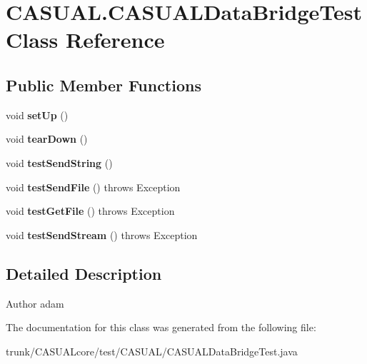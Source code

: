 \hypertarget{classCASUAL_1_1CASUALDataBridgeTest}{\section{C\-A\-S\-U\-A\-L.\-C\-A\-S\-U\-A\-L\-Data\-Bridge\-Test Class Reference}
\label{classCASUAL_1_1CASUALDataBridgeTest}
}
\subsection*{Public Member Functions}
\begin{DoxyCompactItemize}
\item 
\hypertarget{classCASUAL_1_1CASUALDataBridgeTest_a6cbfa475ba06d452fcc0184704e1db26}{void {\bfseries set\-Up} ()}\label{classCASUAL_1_1CASUALDataBridgeTest_a6cbfa475ba06d452fcc0184704e1db26}

\item 
\hypertarget{classCASUAL_1_1CASUALDataBridgeTest_abd31aa43241e809aa8beefe78f632353}{void {\bfseries tear\-Down} ()}\label{classCASUAL_1_1CASUALDataBridgeTest_abd31aa43241e809aa8beefe78f632353}

\item 
\hypertarget{classCASUAL_1_1CASUALDataBridgeTest_aae8e888442289e5a5fbe181ea4252f65}{void {\bfseries test\-Send\-String} ()}\label{classCASUAL_1_1CASUALDataBridgeTest_aae8e888442289e5a5fbe181ea4252f65}

\item 
\hypertarget{classCASUAL_1_1CASUALDataBridgeTest_ad5e3e12bb87e858964deae861531cd88}{void {\bfseries test\-Send\-File} ()  throws Exception }\label{classCASUAL_1_1CASUALDataBridgeTest_ad5e3e12bb87e858964deae861531cd88}

\item 
\hypertarget{classCASUAL_1_1CASUALDataBridgeTest_af34007577ea765e71f5c44e4680ed8a2}{void {\bfseries test\-Get\-File} ()  throws Exception }\label{classCASUAL_1_1CASUALDataBridgeTest_af34007577ea765e71f5c44e4680ed8a2}

\item 
\hypertarget{classCASUAL_1_1CASUALDataBridgeTest_a5fbee8b2fbfc1dfe930c2eda88c00021}{void {\bfseries test\-Send\-Stream} ()  throws Exception }\label{classCASUAL_1_1CASUALDataBridgeTest_a5fbee8b2fbfc1dfe930c2eda88c00021}

\end{DoxyCompactItemize}


\subsection{Detailed Description}
\begin{DoxyAuthor}{Author}
adam 
\end{DoxyAuthor}


The documentation for this class was generated from the following file\-:\begin{DoxyCompactItemize}
\item 
trunk/\-C\-A\-S\-U\-A\-Lcore/test/\-C\-A\-S\-U\-A\-L/C\-A\-S\-U\-A\-L\-Data\-Bridge\-Test.\-java\end{DoxyCompactItemize}

